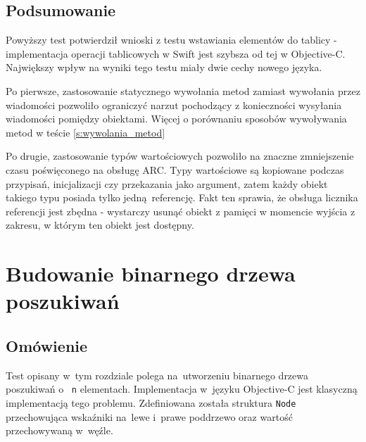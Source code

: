 \documentclass[mgr, shortabstract]{iithesis}
\newcommand{\swiftinline}[1]{
    \texttt{#1}
}
\newcommand{\objcinline}[1]{
    \texttt{#1}
}
\begin{document}
\subsection{Podsumowanie}

Powyższy test potwierdził wnioski z testu wstawiania elementów do tablicy - implementacja operacji tablicowych w Swift jest szybsza od tej w Objective-C. Największy wpływ na wyniki tego testu miały dwie cechy nowego języka.

Po pierwsze, zastosowanie statycznego wywołania metod zamiast wywołania przez wiadomości pozwoliło ograniczyć narzut pochodzący z konieczności wysyłania wiadomości pomiędzy obiektami. Więcej o porównaniu sposobów wywoływania metod w teście \ref{s:wywolania_metod}

Po drugie, zastosowanie typów wartościowych pozwoliło na znaczne zmniejszenie czasu poświęconego na obsługę ARC. Typy wartościowe są kopiowane podczas przypisań, inicjalizacji czy przekazania jako argument, zatem każdy obiekt takiego typu posiada tylko jedną referencję. Fakt ten sprawia, że obsługa licznika referencji jest zbędna - wystarczy usunąć obiekt z pamięci w momencie wyjścia z zakresu, w którym ten obiekt jest dostępny.

\section{Budowanie binarnego drzewa poszukiwań}

\subsection{Omówienie}

Test opisany w~tym rozdziale polega na~utworzeniu binarnego drzewa poszukiwań o~\swiftinline{n} elementach. Implementacja w~języku Objective-C jest klasyczną implementacją tego problemu. Zdefiniowana została struktura \objcinline{Node} przechowująca wskaźniki na~lewe i~prawe poddrzewo oraz wartość przechowywaną w~węźle.
\end{document}
